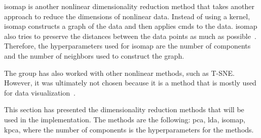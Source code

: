 \gls{isomap} is another nonlinear dimensionality reduction method that takes another approach to reduce the dimensions of nonlinear data. Instead of using a kernel, \gls{isomap} constructs a graph of the data and then applies \gls{cmds} to the data. \gls{isomap} also tries to preserve the distances between the data points as much as possible~\cite{dimensionality-reduction-comparative-review}. Therefore, the hyperparameters used for \gls{isomap} are the number of components and the number of neighbors used to construct the graph.

The group has also worked with other nonlinear methods, such as T-SNE. However, it was ultimately not chosen because it is a method that is mostly used for data visualization~\cite{tsne-visualization}.


This section has presented the dimensionality reduction methods that will be used in the implementation. The methods are the following: \gls{pca}, \gls{lda}, \gls{isomap}, \gls{kpca}, where the number of components is the hyperparameters for the methods.
